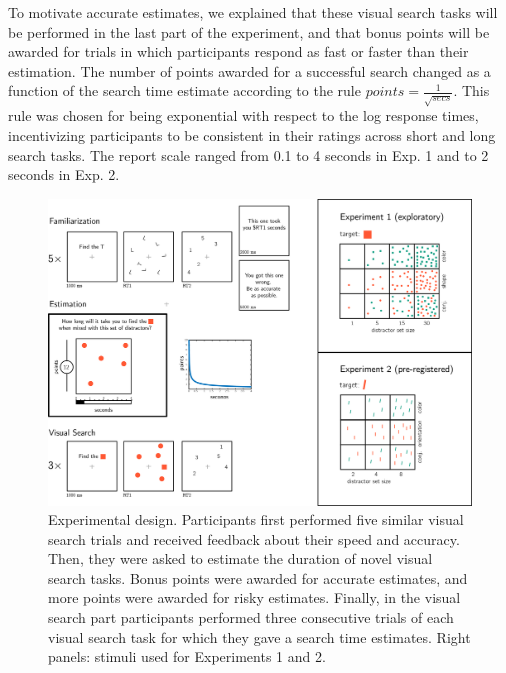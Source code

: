 \documentclass[12pt,twoside]{reedthesis}
\begin{document}
To motivate accurate estimates, we explained that these visual search tasks will be performed in the last part of the experiment, and that bonus points will be awarded for trials in which participants respond as fast or faster than their estimation. The number of points awarded for a successful search changed as a function of the search time estimate according to the rule
\(points=\frac{1}{\sqrt{secs}}\). This rule was chosen for being exponential with respect to the log response times, incentivizing participants to be consistent in their ratings across short and long search tasks. The report scale ranged from 0.1 to 4 seconds in Exp. 1 and to 2 seconds in Exp. 2.
\begin{figure}

{\centering \includegraphics[width=1\linewidth]{figure/ch4/methods1} 

}

\caption{Experimental design. Participants first performed five similar visual search trials and received feedback about their speed and accuracy. Then, they were asked to estimate the duration of novel visual search tasks. Bonus points were awarded for accurate estimates, and more points were awarded for risky estimates. Finally, in the visual search part participants performed three consecutive trials of each visual search task for which they gave a search time estimates. Right panels: stimuli used for Experiments 1 and 2.}\label{fig:ch4-methods1}
\end{figure}
\end{document}
